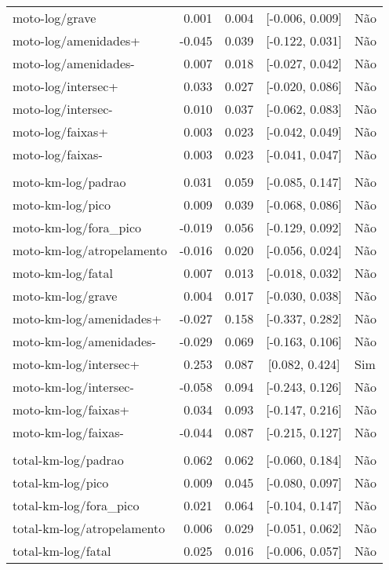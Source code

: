 \begin{longtable}{lrrcl}
moto-log/grave & 0.001 & 0.004 & {}[-0.006, 0.009] & Não\\
moto-log/amenidades+ & -0.045 & 0.039 & {}[-0.122, 0.031] & Não\\
moto-log/amenidades- & 0.007 & 0.018 & {}[-0.027, 0.042] & Não\\
moto-log/intersec+ & 0.033 & 0.027 & {}[-0.020, 0.086] & Não\\
moto-log/intersec- & 0.010 & 0.037 & {}[-0.062, 0.083] & Não\\
moto-log/faixas+ & 0.003 & 0.023 & {}[-0.042, 0.049] & Não\\
moto-log/faixas- & 0.003 & 0.023 & {}[-0.041, 0.047] & Não\\
 &  &  &  & \\
moto-km-log/padrao & 0.031 & 0.059 & {}[-0.085, 0.147] & Não\\
moto-km-log/pico & 0.009 & 0.039 & {}[-0.068, 0.086] & Não\\
moto-km-log/fora\_pico & -0.019 & 0.056 & {}[-0.129, 0.092] & Não\\
moto-km-log/atropelamento & -0.016 & 0.020 & {}[-0.056, 0.024] & Não\\
moto-km-log/fatal & 0.007 & 0.013 & {}[-0.018, 0.032] & Não\\
moto-km-log/grave & 0.004 & 0.017 & {}[-0.030, 0.038] & Não\\
moto-km-log/amenidades+ & -0.027 & 0.158 & {}[-0.337, 0.282] & Não\\
moto-km-log/amenidades- & -0.029 & 0.069 & {}[-0.163, 0.106] & Não\\
moto-km-log/intersec+ & 0.253 & 0.087 & {}[0.082, 0.424] & Sim\\
moto-km-log/intersec- & -0.058 & 0.094 & {}[-0.243, 0.126] & Não\\
moto-km-log/faixas+ & 0.034 & 0.093 & {}[-0.147, 0.216] & Não\\
moto-km-log/faixas- & -0.044 & 0.087 & {}[-0.215, 0.127] & Não\\
 &  &  &  & \\
total-km-log/padrao & 0.062 & 0.062 & {}[-0.060, 0.184] & Não\\
total-km-log/pico & 0.009 & 0.045 & {}[-0.080, 0.097] & Não\\
total-km-log/fora\_pico & 0.021 & 0.064 & {}[-0.104, 0.147] & Não\\
total-km-log/atropelamento & 0.006 & 0.029 & {}[-0.051, 0.062] & Não\\
total-km-log/fatal & 0.025 & 0.016 & {}[-0.006, 0.057] & Não\\

\end{longtable}
